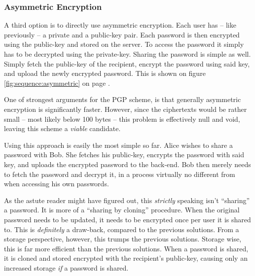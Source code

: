 			\subsubsection{Asymmetric Encryption}
				\label{sec:assymetric}
				A third option is to directly use asymmetric encryption. Each user has -- like previously -- a private and a public-key pair. Each password is then encrypted using the public-key and stored on the server. To access the password it simply has to be decrypted using the private-key. Sharing the password is simple as well. Simply fetch the public-key of the recipient, encrypt the password using said key, and upload the newly encrypted password. This is shown on figure \ref{fig:sequence:asymmetric} on page \pageref{fig:sequence:asymmetric}.


				One of strongest arguments for the PGP scheme, is that generally asymmetric encryption is significantly faster. However, since the ciphertexts would be rather small -- most likely below 100 bytes -- this problem is effectively null and void, leaving this scheme a \emph{viable} candidate.

				Using this approach is easily the most simple so far. Alice wishes to share a password with Bob. She fetches his public-key, encrypts the password with said key, and uploads the encrypted password to the back-end. Bob then merely needs to fetch the password and decrypt it, in a process virtually no different from when accessing his own passwords.

				As the astute reader might have figured out, this \emph{strictly} speaking isn't ``sharing'' a password. It is more of a ``sharing by cloning'' procedure. When the original password needs to be updated, it needs to be encrypted once per user it is shared to. This is \emph{definitely} a draw-back, compared to the previous solutions. From a storage perspective, however, this trumps the previous solutions. Storage wise, this is far more efficient than the previous solutions. When a password is shared, it is cloned and stored encrypted with the recipient's public-key, causing only an increased storage \emph{if} a password is shared.

